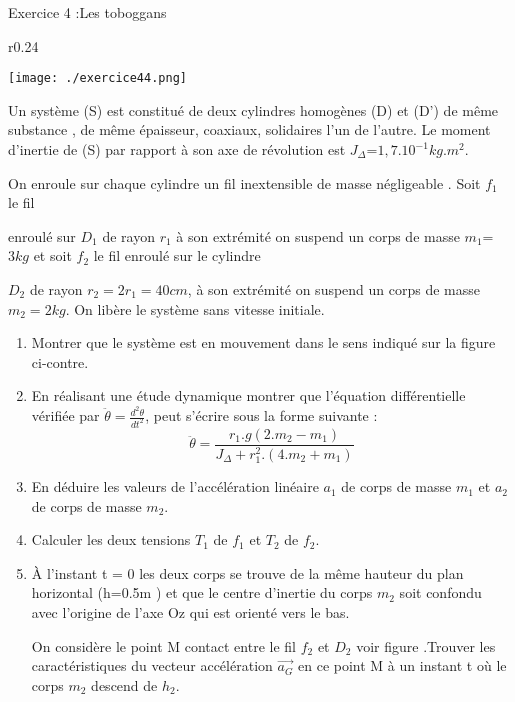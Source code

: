 \documentclass[12pt, french]{article}
\begin{document}
\begin{Box2}{Exercice 4 :Les toboggans}

  \begin{wrapfigure}[8]{r}{0.24\textwidth}
  \vspace{-1cm}
  \begin{center}
    \texttt{[image: ./exercice44.png]}
  \end{center}
\end{wrapfigure}
Un système (S) est constitué de deux cylindres homogènes (D) et (D’) de même substance , de même épaisseur, coaxiaux,
solidaires l’un de l’autre. Le moment d’inertie
de (S) par rapport à son axe de révolution
  est $J_{\Delta} $=$ 1,7.10^{-1}kg.m^2$.

On enroule sur chaque cylindre un fil inextensible de masse négligeable . Soit $f_1$ le fil

enroulé sur $D_1$ de rayon $r_1$ à son extrémité
on suspend un corps de masse $m_1 $=$ 3kg$
et soit $f_2$ le fil enroulé sur le cylindre

$D_2$ de rayon $r_2 = 2r_1 = 40cm$, à son extrémité on suspend un corps de masse $m_2 = 2kg$.
On libère le système sans vitesse initiale.


\begin{enumerate}
  \item Montrer que le système est en mouvement dans le sens indiqué sur la figure ci-contre.
  \item En réalisant une étude dynamique montrer que l’équation différentielle vérifiée par $\ddot{\theta} = \frac{d^2\theta}{dt^2}$, peut s’écrire sous la forme suivante : $$\ddot{\theta} = \frac{r_1.g(2.m_2 - m_1)}{J_{\Delta} + r_1^2.(4.m_2 + m_1)}$$
  \item En déduire les valeurs de l’accélération linéaire $a_1$ de corps de masse $m_1$ et $a_2$ de corps de masse $m_2$.
  \item Calculer les deux tensions $T_1$ de $f_1$ et $T_2$ de $f_2$.
  \item À l’instant t = 0 les deux corps se trouve de la même hauteur du plan horizontal
    (h=0.5m ) et que le centre d’inertie du corps $m_2$ soit confondu avec l’origine de l’axe
Oz qui est orienté vers le bas.

On considère le point M contact entre le fil $f_2$ et $D_2$ voir figure .Trouver les caractéristiques du vecteur accélération $\vec{a_G}$ en ce point M à un instant t où le corps $m_2$ descend de $h_2$.

\end{enumerate}

\end{Box2}
\end{document}
